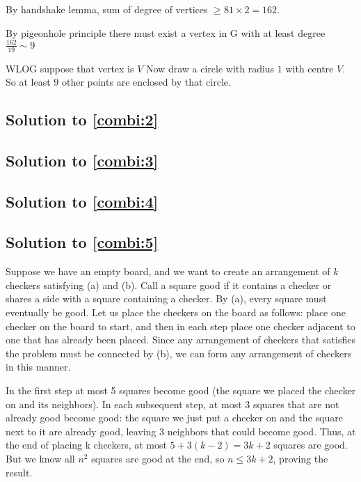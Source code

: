 By handshake lemma, sum of degree of vertices $\ge 81\times 2=162$. 

By pigeonhole principle there must exist a vertex in G with at least degree $\frac{162}{19} \sim 9$

WLOG suppose that vertex is $V$ Now draw a circle with radius $1$ with centre $V$. So at least $9$ other points are enclosed by that circle.

\subsection*{Solution to \autoref{combi:2}}

\subsection*{Solution to \autoref{combi:3}}


\subsection*{Solution to \autoref{combi:4}}

\subsection*{Solution to \autoref{combi:5}}
Suppose we have an empty board, and we want to create an arrangement of $k$ checkers satisfying (a) and (b). Call a square good if it contains a checker or shares a side with a square containing a checker. By (a), every square must eventually be good. Let us place the checkers on the board as follows: place one checker on the board to start, and then in each step place one checker adjacent to one that has already been placed. Since any arrangement of checkers that satisfies the problem must be connected by (b), we can form any arrangement of checkers in this manner. 

In the first step at most 5 squares become good (the square we placed the checker on and its neighbors). In each subsequent step, at most 3 squares that are not already good become good: the square we just put a checker on and the square next to it are already good, leaving 3 neighbors that could become good. Thus, at the end of placing k checkers, at most $5+3(k-2) = 3k+2$ squares  are good. But we know all $n^2$ squares are good at the end, so $n \le 3k+2$, proving the result.








